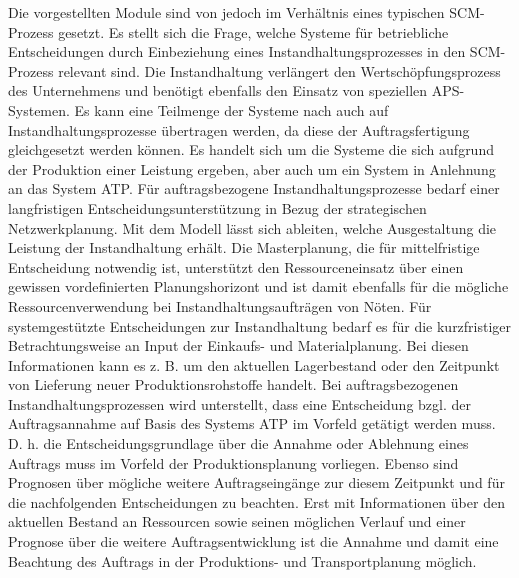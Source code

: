 Die vorgestellten Module sind von \cite{meyr2015structure} jedoch im Verhältnis eines typischen SCM-Prozess gesetzt. Es stellt sich die Frage, welche Systeme für betriebliche Entscheidungen durch Einbeziehung eines Instandhaltungsprozesses in den SCM-Prozess relevant sind. Die Instandhaltung verlängert den Wertschöpfungsprozess des Unternehmens und benötigt ebenfalls den Einsatz von speziellen APS-Systemen. Es kann eine Teilmenge der Systeme nach \cite{meyr2015structure} auch auf Instandhaltungsprozesse übertragen werden, da diese der Auftragsfertigung gleichgesetzt werden können. Es handelt sich um die Systeme die sich aufgrund der Produktion einer Leistung ergeben, aber auch um ein System in Anlehnung an das System ATP. Für auftragsbezogene Instandhaltungsprozesse bedarf einer langfristigen Entscheidungsunterstützung in Bezug der strategischen Netzwerkplanung. Mit dem Modell lässt sich ableiten, welche Ausgestaltung die Leistung der Instandhaltung erhält. Die Masterplanung, die für mittelfristige Entscheidung notwendig ist, unterstützt den Ressourceneinsatz über einen gewissen vordefinierten Planungshorizont und ist damit ebenfalls für die mögliche Ressourcenverwendung bei Instandhaltungsaufträgen von Nöten. Für systemgestützte Entscheidungen zur Instandhaltung bedarf es für die kurzfristiger Betrachtungsweise an Input der Einkaufs- und Materialplanung. Bei diesen Informationen kann es z. B. um den aktuellen Lagerbestand oder den Zeitpunkt von Lieferung neuer Produktionsrohstoffe handelt. Bei auftragsbezogenen Instandhaltungsprozessen wird unterstellt, dass eine Entscheidung bzgl. der Auftragsannahme auf Basis des Systems ATP im Vorfeld getätigt werden muss. D. h. die Entscheidungsgrundlage über die Annahme oder Ablehnung eines Auftrags muss im Vorfeld der Produktionsplanung vorliegen. Ebenso sind Prognosen über mögliche weitere Auftragseingänge zur diesem Zeitpunkt und für die nachfolgenden Entscheidungen zu beachten. Erst mit Informationen über den aktuellen Bestand an Ressourcen sowie seinen möglichen Verlauf und einer Prognose über die weitere Auftragsentwicklung  ist die Annahme und damit eine Beachtung des Auftrags in der Produktions- und Transportplanung möglich.

